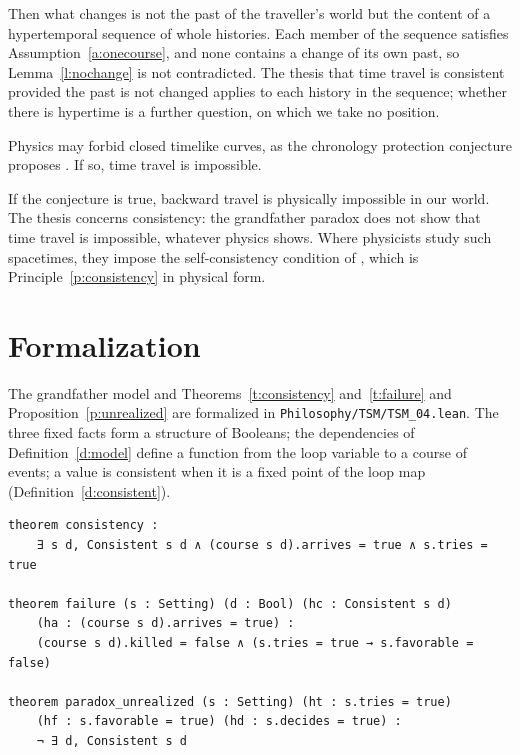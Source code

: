 \documentclass{situationist-preprint}
\begin{document}
\begin{reply}
Then what changes is not the past of the traveller's world but the content of a hypertemporal sequence of whole histories. Each member of the sequence satisfies Assumption~\ref{a:onecourse}, and none contains a change of its own past, so Lemma~\ref{l:nochange} is not contradicted. The thesis that time travel is consistent provided the past is not changed applies to each history in the sequence; whether there is hypertime is a further question, on which we take no position.
\end{reply}

\begin{objection}
Physics may forbid closed timelike curves, as the chronology protection conjecture proposes \citep{Hawking1992}. If so, time travel is impossible.
\end{objection}

\begin{reply}
If the conjecture is true, backward travel is physically impossible in our world. The thesis concerns consistency: the grandfather paradox does not show that time travel is impossible, whatever physics shows. Where physicists study such spacetimes, they impose the self-consistency condition of \citet{Friedman1990}, which is Principle~\ref{p:consistency} in physical form.
\end{reply}

\section{Formalization}

The grandfather model and Theorems~\ref{t:consistency} and~\ref{t:failure} and Proposition~\ref{p:unrealized} are formalized in \nolinkurl{Philosophy/TSM/TSM_04.lean}. The three fixed facts form a structure of Booleans; the dependencies of Definition~\ref{d:model} define a function from the loop variable to a course of events; a value is consistent when it is a fixed point of the loop map (Definition~\ref{d:consistent}).

\begin{lstlisting}
theorem consistency :
    ∃ s d, Consistent s d ∧ (course s d).arrives = true ∧ s.tries = true

theorem failure (s : Setting) (d : Bool) (hc : Consistent s d)
    (ha : (course s d).arrives = true) :
    (course s d).killed = false ∧ (s.tries = true → s.favorable = false)

theorem paradox_unrealized (s : Setting) (ht : s.tries = true)
    (hf : s.favorable = true) (hd : s.decides = true) :
    ¬ ∃ d, Consistent s d
\end{lstlisting}
\end{document}
